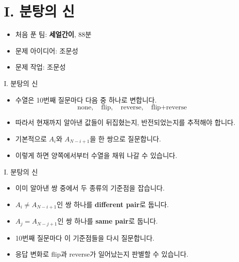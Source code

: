 \def\probno{I}
\def\probtitle{분탕의 신}

\section{\probno{}. \probtitle{}}

\begin{frame}
    \sectiontitle{\probno{}}{\probtitle{}}
    \begin{itemize}
        \item 처음 푼 팀: \textbf{세얼간이}, 88분
        \item 문제 아이디어: 조문성
        \item 문제 작업: 조문성
    \end{itemize}
\end{frame}

\begin{frame}{\probno{}. \probtitle{}}
    \begin{itemize}
        \item 수열은 10번째 질문마다 다음 중 하나로 변합니다.
        \[
            \text{none},\quad \text{flip},\quad \text{reverse},\quad \text{flip+reverse}
        \]
        \item 따라서 현재까지 알아낸 값들이 뒤집혔는지, 반전되었는지를 추적해야 합니다.
        \item 기본적으로 $A_i$와 $A_{N-i+1}$을 한 쌍으로 질문합니다.
        \item 이렇게 하면 양쪽에서부터 수열을 채워 나갈 수 있습니다.
    \end{itemize}
\end{frame}

\begin{frame}{\probno{}. \probtitle{}}
    \begin{itemize}
        \item 이미 알아낸 쌍 중에서 두 종류의 기준점을 잡습니다.
        \item $A_i \ne A_{N-i+1}$인 쌍 하나를 \textbf{different pair}로 둡니다.
        \item $A_j = A_{N-j+1}$인 쌍 하나를 \textbf{same pair}로 둡니다.
        \item 10번째 질문마다 이 기준점들을 다시 질문합니다.
        \item 응답 변화로 flip과 reverse가 일어났는지 판별할 수 있습니다.
    \end{itemize}
\end{frame}

